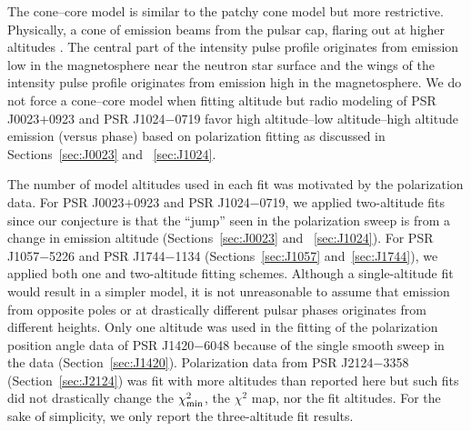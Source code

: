 The cone--core model is similar to the patchy cone model but more restrictive.
Physically, a cone of emission beams from the pulsar cap,
flaring out at higher altitudes \citep{radhakrishnan1969magnetic}.
The central part of the intensity pulse profile originates from emission 
low in the magnetosphere near the
neutron star surface and the wings of the intensity pulse profile
originates from emission high in the magnetosphere.
We do not force a cone--core model when fitting altitude but radio modeling 
of PSR J0023$+$0923 and PSR J1024$-$0719 favor high altitude--low altitude--high altitude emission (versus phase)
based on polarization fitting as discussed in Sections~\ref{sec:J0023} and
~\ref{sec:J1024}.

The number of model altitudes used in each fit was motivated
by the polarization data.  For PSR J0023$+$0923 and PSR J1024$-$0719,
we applied two-altitude fits since our conjecture is that the 
``jump'' seen in the polarization sweep is from a change
in emission altitude
(Sections~\ref{sec:J0023} and ~\ref{sec:J1024}).
For PSR J1057$-$5226 and PSR J1744$-$1134 
(Sections~\ref{sec:J1057} and~\ref{sec:J1744}), we applied both one and
two-altitude fitting schemes.  Although a single-altitude
fit would result in a simpler model, it is not unreasonable
to assume that emission from opposite poles or at drastically 
different pulsar phases originates from different heights.
Only one altitude was used in the fitting of the polarization position
angle data of PSR J1420$-$6048 because of the single smooth sweep
in the data (Section~\ref{sec:J1420}).  Polarization data from PSR J2124$-$3358 
(Section~\ref{sec:J2124}) was
fit with more altitudes than reported here but 
such fits did not drastically change the $\chi_{\rm{min}}^2$, the $\chi^2$
map, nor the fit altitudes.  For the sake of simplicity, we 
only report the three-altitude fit results.


